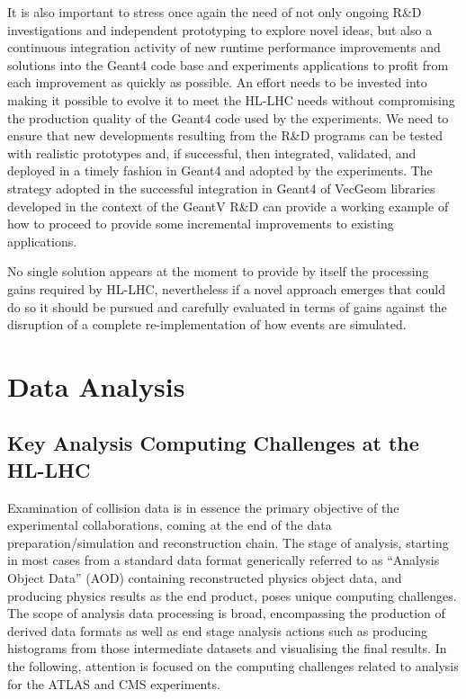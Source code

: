 \documentclass[11pt,a4paper]{article}
\begin{document}
It is also important to stress once again the need of not only ongoing
R\&D investigations and independent prototyping to explore novel ideas,
but also a continuous integration activity of new runtime performance
improvements and solutions into the Geant4 code base and experiments
applications to profit from each improvement as quickly as possible. An
effort needs to be invested into making it possible to evolve it to meet
the HL-LHC needs without compromising the production quality of the
Geant4 code used by the experiments. We need to ensure that new
developments resulting from the R\&D programs can be tested with
realistic prototypes and, if successful, then integrated, validated, and
deployed in a timely fashion in Geant4 and adopted by the experiments.
The strategy adopted in the successful integration in Geant4 of VecGeom
libraries developed in the context of the GeantV R\&D can provide a
working example of how to proceed to provide some incremental
improvements to existing applications.

No single solution appears at the moment to provide by itself the
processing gains required by HL-LHC, nevertheless if a novel approach
emerges that could do so it should be pursued and carefully evaluated in
terms of gains against the disruption of a complete re-implementation of
how events are simulated.




\hypertarget{data-analysis}{%
\section{Data Analysis}\label{data-analysis}}

\hypertarget{key-analysis-computing-challenges-at-the-hl-lhc}{%
\subsection{Key Analysis Computing Challenges at the
HL-LHC}\label{key-analysis-computing-challenges-at-the-hl-lhc}}

Examination of collision data is in essence the primary objective of the
experimental collaborations, coming at the end of the data
preparation/simulation and reconstruction chain. The stage of analysis,
starting in most cases from a standard data format generically referred
to as ``Analysis Object Data'' (AOD) containing reconstructed physics
object data, and producing physics results as the end product, poses
unique computing challenges. The scope of analysis data processing is
broad, encompassing the production of derived data formats as well as
end stage analysis actions such as producing histograms from those
intermediate datasets and visualising the final results. In the
following, attention is focused on the computing challenges related to
analysis for the ATLAS and CMS experiments.
\end{document}
